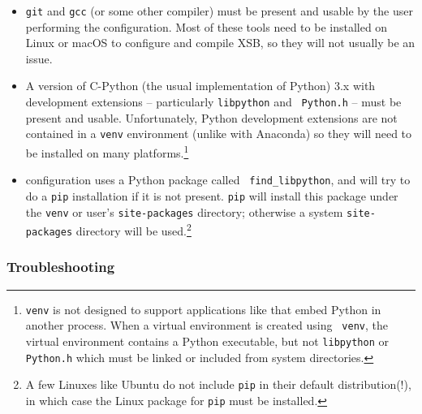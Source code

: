 \begin{itemize}
\item {\tt git} and {\tt gcc} (or some other compiler) must be present
  and usable by the user performing the configuration.  Most of these
  tools need to be installed on Linux or macOS to configure and
  compile XSB, so they will not usually be an issue.

\item A version of C-Python (the usual implementation of Python) 3.x
  with development extensions -- particularly {\tt libpython} and {\tt
    Python.h} -- must be present and usable.
  Unfortunately, Python development extensions are not contained in a
  {\tt venv} environment (unlike with Anaconda) so they will need to
  be installed on many platforms.\footnote{{\tt venv} is not designed
  to support applications like \janusplg{} that embed Python in
  another process.  When a virtual environment is created using {\tt
    venv}, the virtual environment contains a Python executable, but
  not {\tt libpython} or {\tt Python.h} which must be linked or
  included from system directories.}

  \item \janusplg{} configuration uses a Python package called {\tt
    find\_libpython}, and will try to do a {\tt pip} installation if
    it is not present.  {\tt pip} will install this package under the
    {\tt venv} or user's {\tt site-packages} directory; otherwise a
    system {\tt site-packages} directory will be used.\footnote{A few
    Linuxes like Ubuntu do not include {\tt pip} in their default
    distribution(!), in which case the Linux package for {\tt pip}
    must be installed.}
\end{itemize}



\subsubsection{Troubleshooting}

%  

